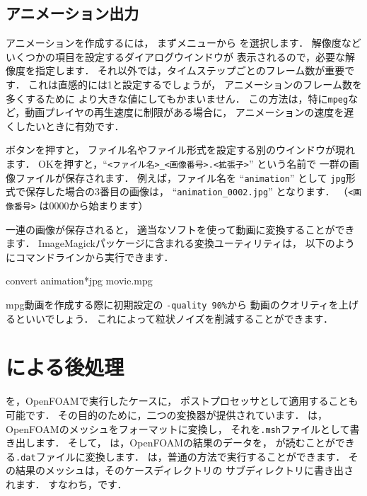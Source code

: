 \subsection{アニメーション出力}
\label{ssec:6.1.10}
アニメーションを作成するには，
まずメニューから
%
%
を選択します．
解像度などいくつかの項目を設定するダイアログウインドウが
表示されるので，必要な解像度を指定します．
それ以外では，タイムステップごとのフレーム数が重要です．
これは直感的には1と設定するでしょうが，
アニメーションのフレーム数を多くするために
より大きな値にしてもかまいません．
この方法は，特に\texttt{mpeg}など，動画プレイヤの再生速度に制限がある場合に，
アニメーションの速度を遅くしたいときに有効です．

ボタンを押すと，
ファイル名やファイル形式を設定する別のウインドウが現れます．
OKを押すと，``\verb|<ファイル名>_<画像番号>.<拡張子>|'' という名前で
一群の画像ファイルが保存されます．
例えば，ファイル名を ``\verb|animation|'' として
\texttt{jpg}形式で保存した場合の3番目の画像は，
``\verb|animation_0002.jpg|'' となります．
（\verb|<画像番号>| は0000から始まります）

一連の画像が保存されると，
適当なソフトを使って動画に変換することができます．
ImageMagickパッケージに含まれる変換ユーティリティは，
以下のようにコマンドラインから実行できます．
\begin{OFverbatim}[terminal]
convert animation*jpg movie.mpg
\end{OFverbatim}
mpg動画を作成する際に初期設定の \verb|-quality 90%|から
動画のクオリティを上げるといいでしょう．
これによって粒状ノイズを削減することができます．



\section{による後処理}
\label{sec:6.2}
を，OpenFOAMで実行したケースに，
ポストプロセッサとして適用することも可能です．
その目的のために，二つの変換器が提供されています．
%
%
は，
OpenFOAMのメッシュをフォーマットに変換し，
それを\texttt{.msh}ファイルとして書き出します．
そして，
%
%
は，OpenFOAMの結果のデータを，
が読むことができる\texttt{.dat}ファイルに変換します．
は，普通の方法で実行することができます．
その結果のメッシュは，そのケースディレクトリの
%
%
サブディレクトリに書き出されます．
すなわち，です．

